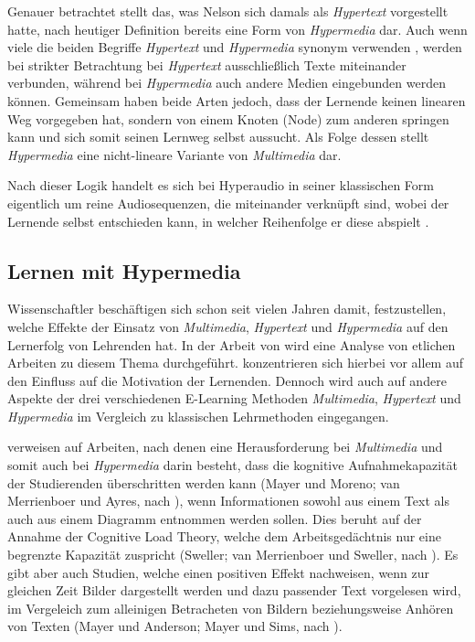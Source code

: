 Genauer betrachtet stellt das, was Nelson sich damals als \textit{Hypertext} vorgestellt hatte, nach heutiger Definition bereits eine Form von \textit{Hypermedia} dar. Auch wenn viele die beiden Begriffe \textit{Hypertext} und \textit{Hypermedia} synonym verwenden \citep{nielsen2013multimedia}, werden bei strikter Betrachtung bei \textit{Hypertext} ausschließlich Texte miteinander verbunden, während bei \textit{Hypermedia} auch andere Medien eingebunden werden können. Gemeinsam haben beide Arten jedoch, dass der Lernende keinen linearen Weg vorgegeben hat, sondern von einem Knoten (Node) zum anderen springen kann und sich somit seinen Lernweg selbst aussucht. Als Folge dessen stellt \textit{Hypermedia} eine nicht-lineare Variante von \textit{Multimedia} dar.

Nach dieser Logik handelt es sich bei Hyperaudio in seiner klassischen Form eigentlich um reine Audiosequenzen, die miteinander verknüpft sind, wobei der Lernende selbst entschieden kann, in welcher Reihenfolge er diese abspielt \citep{zumbach2006learning}.


\subsection{Lernen mit Hypermedia}
Wissenschaftler beschäftigen sich schon seit vielen Jahren damit, festzustellen, welche Effekte der Einsatz von \textit{Multimedia}, \textit{Hypertext} und \textit{Hypermedia} auf den Lernerfolg von Lehrenden hat. In der Arbeit von \cite{moos2010multimedia} wird eine Analyse von etlichen Arbeiten zu diesem Thema durchgeführt. \cite{moos2010multimedia} konzentrieren sich hierbei vor allem auf den Einfluss auf die Motivation der Lernenden. Dennoch wird auch auf andere Aspekte der drei verschiedenen E-Learning Methoden \textit{Multimedia}, \textit{Hypertext} und  \textit{Hypermedia} im Vergleich zu klassischen Lehrmethoden eingegangen.

\cite{moos2010multimedia} verweisen auf Arbeiten, nach denen eine Herausforderung bei \textit{Multimedia} und somit auch bei \textit{Hypermedia} darin besteht, dass die kognitive Aufnahmekapazität der Studierenden überschritten werden kann (Mayer und Moreno; van Merrienboer und Ayres, nach \cite{moos2010multimedia}), wenn Informationen sowohl aus einem Text als auch aus einem Diagramm entnommen werden sollen. Dies beruht auf der Annahme der Cognitive Load Theory, welche dem Arbeitsgedächtnis nur eine begrenzte Kapazität zuspricht (Sweller; van Merrienboer und Sweller, nach \cite{moos2010multimedia}). Es gibt aber auch Studien, welche einen positiven Effekt nachweisen, wenn zur gleichen Zeit Bilder dargestellt werden und dazu passender Text vorgelesen wird, im Vergeleich zum alleinigen Betracheten von Bildern beziehungsweise Anhören von Texten (Mayer und Anderson; Mayer und Sims, nach \cite{moos2010multimedia}).

